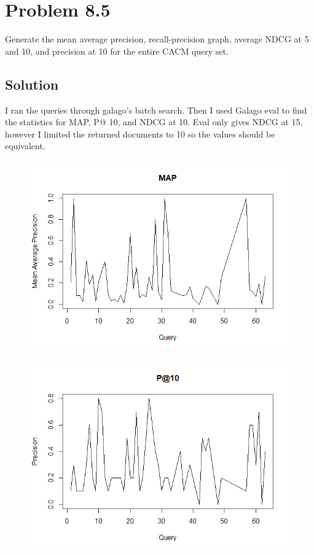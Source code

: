 \documentclass[letterpaper,12pt]{article}
\begin{document}
\pagebreak

\section{Problem 8.5}
Generate the mean average precision, recall-precision graph, average NDCG at 5 and 10, and precision at 10 for the entire CACM query set.

\subsection{Solution}

I ran the queries through galago's batch search. Then I used Galago eval to find the statistics for MAP, P@ 10, and NDCG at 10. Eval only gives NDCG at 15, however I limited the returned documents to 10 so the values should be equivalent. 

\begin{figure}
  \includegraphics[width=\linewidth]{85map.PNG}
  \label{fig:CACM map}
\end{figure}

\begin{figure}
  \includegraphics[width=\linewidth]{85p10.PNG}
  \label{fig:CACM p10}
\end{figure}
\end{document}
